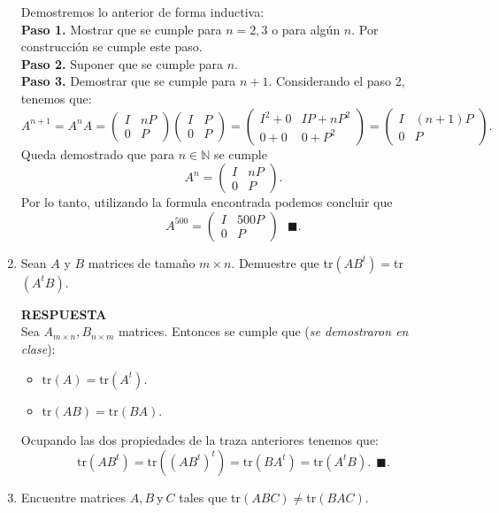 \documentclass[11pt,letterpaper]{article}
\newcommand{\res}{\textbf{RESPUESTA}\\}
\newcommand{\finf}{\blacksquare.}
\newcommand{\tr}{\text{tr}}
\begin{document}
\begin{enumerate}
Demostremos lo anterior de forma inductiva: \\
\textbf{Paso 1.} Mostrar que se cumple para $n=2,3$ o para algún $n$. Por construcción se cumple este paso.\\
\textbf{Paso 2.} Suponer que se cumple para $n$.\\
\textbf{Paso 3.} Demostrar que se cumple para $n+1$. Considerando el paso 2, tenemos que:
\begin{equation*}
A^{n+1}=A^nA=\left(\begin{array}{cc}
I& nP\\
0&P
\end{array}
\right)\left(\begin{array}{cc}
I& P\\
0&P
\end{array}
\right)=\left(\begin{array}{cc}
I^2+0& IP+nP^2\\
0+0&0+P^2
\end{array}
\right)=\left(\begin{array}{cc}
I&(n+1)P\\
0&P
\end{array}
\right).
\end{equation*}
Queda demostrado que para $n\in \mathbb{N}$ se cumple
\begin{equation*}
A^n= \left(\begin{array}{cc}
I&nP\\
0&P
\end{array}
\right).
\end{equation*}
Por lo tanto, utilizando la formula encontrada podemos concluir que 
\begin{equation*}
A^{500}=\left(\begin{array}{cc}
I& 500P\\
0&P
\end{array}
\right)\ \ \  \finf
\end{equation*}

\item Sean $A$ y $B$ matrices de tamaño $m\times n$. Demuestre que tr$(AB^t)=$tr$(A^tB)$. 

\res
Sea $A_{m\times n}, B_{n\times m}$ matrices. Entonces se cumple que (\textit{se demostraron en clase}):
\begin{itemize}
\item $\tr(A)=\tr(A^t).$
\item $\tr(AB)=\tr(BA)$.
\end{itemize}
Ocupando las dos propiedades de la traza anteriores tenemos que:
$$\tr(AB^t)=\tr((AB^t)^t)=\tr(BA^t)=\tr(A^tB). \ \ \finf$$
\item Encuentre matrices $A, B \ \text{y} \ C$ tales que tr$(ABC)\neq$tr$(BAC)$.


\end{enumerate}
\end{document}
